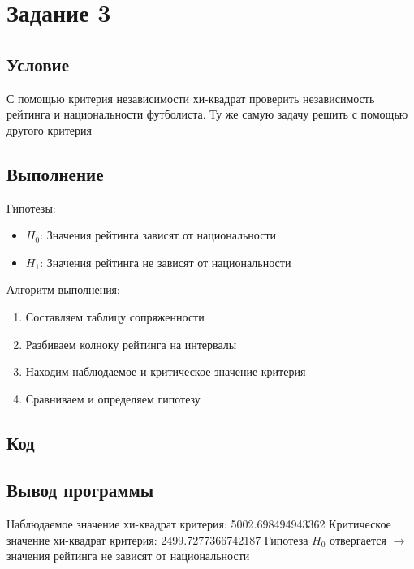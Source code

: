 \documentclass{article}
\begin{document}
\section{Задание 3}
\subsection{Условие}
С помощью критерия независимости хи-квадрат проверить независимость рейтинга и национальности футболиста. Ту же самую задачу решить с помощью другого критерия
\subsection{Выполнение}
Гипотезы:
\begin{itemize}
      \item $H_0$: Значения рейтинга зависят от национальности
      \item $H_1$: Значения рейтинга не зависят от национальности
\end{itemize}
Алгоритм выполнения:
\begin{enumerate}
      \item Составляем таблицу сопряженности
      \item Разбиваем колноку рейтинга на интервалы
      \item Находим наблюдаемое и критическое значение критерия
      \item Сравниваем и определяем гипотезу
\end{enumerate}
\subsection{Код}
\subsection{Вывод программы}
Наблюдаемое значение хи-квадрат критерия: 5002.698494943362
Критическое значение хи-квадрат критерия: 2499.7277366742187
Гипотеза $H_0$ отвергается $\rightarrow$ значения рейтинга не зависят от национальности
\end{document}
